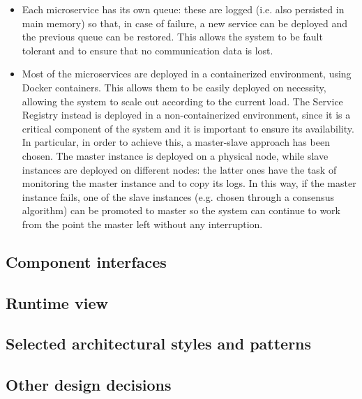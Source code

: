 \begin{itemize}
    \item Each microservice has its own queue: these are logged (i.e. also persisted in main memory) so that, in case of failure, a new service can be deployed and the previous queue can be restored. This allows the system to be fault tolerant and to ensure that no communication data is lost.
    \item Most of the microservices are deployed in a containerized environment, using Docker containers. This allows them to be easily deployed on necessity, allowing the system to scale out according to the current load. The Service Registry instead is deployed in a non-containerized environment, since it is a critical component of the system and it is important to ensure its availability. In particular, in order to achieve this, a master-slave approach has been chosen. The master instance is deployed on a physical node, while slave instances are deployed on different nodes: the latter ones have the task of monitoring the master instance and to copy its logs. In this way, if the master instance fails, one of the slave instances (e.g. chosen through a consensus algorithm) can be promoted to master so the system can continue to work from the point the master left without any interruption.
\end{itemize}

\subsection{Component interfaces}
\subsection{Runtime view}
\subsection{Selected architectural styles and patterns}
\subsection{Other design decisions}